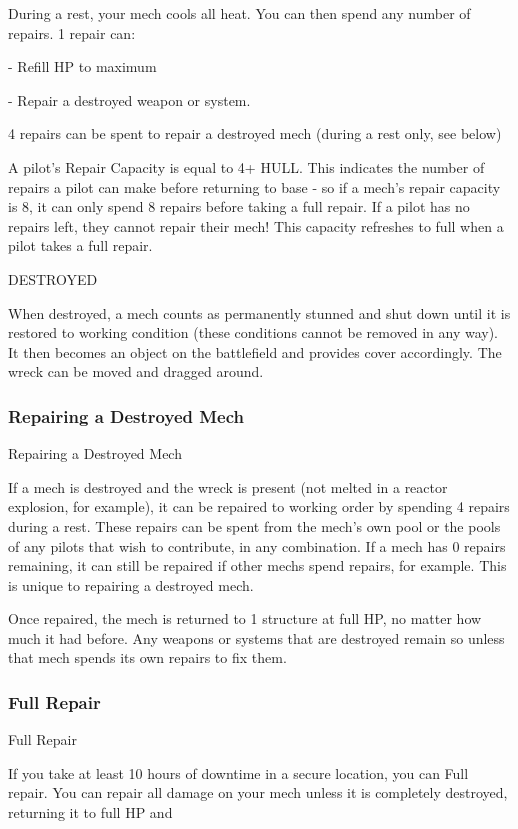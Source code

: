 During a rest, your mech cools all heat. You can then spend any number of repairs. 1 repair can:

    -    Refill HP to maximum

    -    Repair a destroyed weapon or system.

4 repairs can be spent to repair a destroyed mech (during a rest only, see below)


A pilot’s Repair Capacity is equal to 4+ HULL. This indicates the number of repairs a pilot can
make before returning to base - so if a mech’s repair capacity is 8, it can only spend 8 repairs
before taking a full repair. If a pilot has no repairs left, they cannot repair their mech! This
capacity refreshes to full when a pilot takes a full repair.


                                                 DESTROYED

When destroyed, a mech counts as permanently stunned and shut down until it is restored to
working condition (these conditions cannot be removed in any way). It then becomes an object
on the battlefield and provides cover accordingly. The wreck can be moved and dragged around.

\subsubsection{Repairing a Destroyed Mech}
                                  Repairing a Destroyed Mech

If a mech is destroyed and the wreck is present (not melted in a reactor explosion, for example), it
can be repaired to working order by spending 4 repairs during a rest. These repairs can be spent
from the mech’s own pool or the pools of any pilots that wish to contribute, in any combination. If a
mech has 0 repairs remaining, it can still be repaired if other mechs spend repairs, for example.
This is unique to repairing a destroyed mech.

Once repaired, the mech is returned to 1 structure at full HP, no matter how much it had before.
Any weapons or systems that are destroyed remain so unless that mech spends its own repairs to
fix them.
\subsubsection{Full Repair}
                                                Full Repair

If you take at least 10 hours of downtime in a secure location, you can Full repair. You can
repair all damage on your mech unless it is completely destroyed, returning it to full HP and





